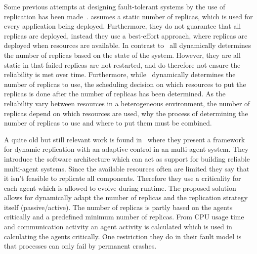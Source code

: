 \documentclass{cslthse-msc}
\begin{document}
Some previous attempts at designing fault-tolerant systems by the use of replication has been made~\cite{designFaultTolerantSched, evalReplicationSched, taskSchedulingReplication, effTaskReplMobGrid, relGridServicePredConstraint}. \cite{evalReplicationSched} assumes a static number of replicas, which is used for every application being deployed. Furthermore, they do not guarantee that all replicas are deployed, instead they use a best-effort approach, where replicas are deployed when resources are available. In contrast to~\cite{evalReplicationSched, effTaskReplMobGrid, taskSchedulingReplication, designFaultTolerantSched} all dynamically determines the number of replicas based on the state of the system. However, they are all static in that failed replicas are not restarted, and do therefore not ensure the reliability is met over time. Furthermore, while~\cite{designFaultTolerantSched} dynamically determines the number of replicas to use, the scheduling decision on which resources to put the replicas is done after the number of replicas has been determined. As the reliability vary between resources in a heterogeneous environment, the number of replicas depend on which resources are used, why the process of determining the number of replicas to use and where to put them must be combined.

A quite old but still relevant work is found in~\cite{dynAdaptRepl} where they present a framework for dynamic replication with an adaptive control in an multi-agent system. They introduce the software architecture which can act as support for building reliable multi-agent systems. Since the available resources often are limited they say that it isn't feasible to replicate all components. Therefore they use a criticality for each agent which is allowed to evolve during runtime. The proposed solution allows for dynamically adapt the number of replicas and the replication strategy itself (passive/active). The number of replicas is partly based on the agents critically and a predefined minimum number of replicas. From CPU usage time and communication activity an agent activity is calculated which is used in calculating the agents critically. One restriction they do in their fault model is that processes can only fail by permanent crashes. %
\end{document}
